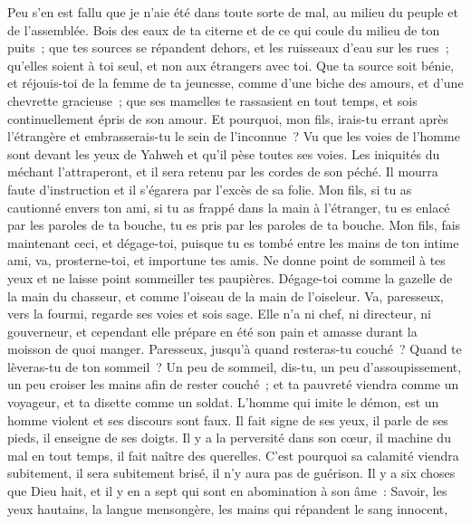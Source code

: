 \begin{multicols}{2}
Peu s'en est fallu que je n'aie été dans toute sorte de mal, au milieu du peuple et de l'assemblée.
Bois des eaux de ta citerne et de ce qui coule du milieu de ton puits~;
que tes sources se répandent dehors, et les ruisseaux d'eau sur les rues~;
qu'elles soient à toi seul, et non aux étrangers avec toi.
Que ta source soit bénie, et réjouis-toi de la femme de ta jeunesse,
comme d'une biche des amours, et d'une chevrette gracieuse~; que ses mamelles te rassasient en tout temps, et sois continuellement épris de son amour.
Et pourquoi, mon fils, irais-tu errant après l'étrangère et embrasserais-tu le sein de l'inconnue~?
Vu que les voies de l'homme sont devant les yeux de Yahweh et qu'il pèse toutes ses voies.
Les iniquités du méchant l'attraperont, et il sera retenu par les cordes de son péché.
Il mourra faute d'instruction et il s'égarera par l'excès de sa folie.
\VerseOne{}Mon fils, si tu as cautionné envers ton ami, si tu as frappé dans la main à l'étranger,
tu es enlacé par les paroles de ta bouche, tu es pris par les paroles de ta bouche.
Mon fils, fais maintenant ceci, et dégage-toi, puisque tu es tombé entre les mains de ton intime ami, va, prosterne-toi, et importune tes amis.
Ne donne point de sommeil à tes yeux et ne laisse point sommeiller tes paupières.
Dégage-toi comme la gazelle de la main du chasseur, et comme l'oiseau de la main de l'oiseleur.
Va, paresseux, vers la fourmi, regarde ses voies et sois sage.
Elle n'a ni chef, ni directeur, ni gouverneur,
et cependant elle prépare en été son pain et amasse durant la moisson de quoi manger.
Paresseux, jusqu'à quand resteras-tu couché~? Quand te lèveras-tu de ton sommeil~?
Un peu de sommeil, dis-tu, un peu d'assoupissement, un peu croiser les mains afin de rester couché~;
et ta pauvreté viendra comme un voyageur, et ta disette comme un soldat.
L'homme qui imite le démon, est un homme violent et ses discours sont faux.
Il fait signe de ses yeux, il parle de ses pieds, il enseigne de ses doigts.
Il y a la perversité dans son cœur, il machine du mal en tout temps, il fait naître des querelles.
C'est pourquoi sa calamité viendra subitement, il sera subitement brisé, il n'y aura pas de guérison.
Il y a six choses que Dieu hait, et il y en a sept qui sont en abomination à son âme~:
Savoir, les yeux hautains, la langue mensongère, les mains qui répandent le sang innocent,

\end{multicols}
